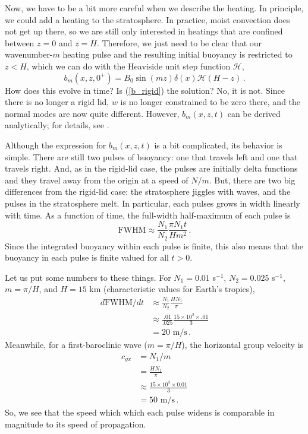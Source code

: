 \documentclass[12pt]{article}
\begin{document}
Now, we have to be a bit more careful when we describe the heating.  In principle, we could add a heating to the stratosphere.  In practice, moist convection does not get up there, so we are still only interested in heatings that are confined between $z=0$ and $z=H$.  Therefore, we just need to be clear that our wavenumber-$m$ heating pulse and the resulting initial buoyancy is restricted to $z<H$, which we can do with the Heaviside unit step function $\mathcal{H}$,
\begin{equation}
b_m(x,z,0^+) = B_0 \sin(mz) \delta(x) \mathcal{H}(H-z) \, . \label{b_initial_leaky}
\end{equation}
How does this evolve in time?  Is (\ref{b_rigid}) the solution?  No, it is not.  Since there is no longer a rigid lid, $w$ is no longer constrained to be zero there, and the normal modes are now quite different.  However, $b_m(x,z,t)$ can be derived analytically; for details, see \citet{15leaky}.


Although the expression for $b_m(x,z,t)$ is a bit complicated, its behavior is simple.  There are still two pulses of buoyancy: one that travels left and one that travels right.  And, as in the rigid-lid case, the pulses are initially delta functions and they travel away from the origin at a speed of $N/m$.  But, there are two big differences from the rigid-lid case: the stratosphere jiggles with waves, and the pulses in the stratosphere melt.  In particular, each pulses grows in width linearly with time.  As a function of time, the full-width half-maximum of each pulse is
\[
\text{FWHM} \approx \frac{N_1}{N_2} \frac{\pi N_1 t}{H m^2} \, .
\]
Since the integrated buoyancy within each pulse is finite, this also means that the buoyancy in each pulse is finite valued for all $t>0$.


Let us put some numbers to these things.  For $N_1 = 0.01$ s$^{-1}$, $N_2 = 0.025$ s$^{-1}$, $m = \pi/H$, and $H = 15$ km (characteristic values for Earth's tropics), 
\begin{align}
d\text{FWHM}/dt &\approx \frac{N_1}{N_2} \frac{H N_1}{\pi} \\
&\approx \frac{.01}{.025} \frac{15 \times 10^3 \times .01}{3} \\
&= 20 \text{ m/s} \, .
\end{align}
Meanwhile, for a first-baroclinic wave ($m = \pi/H$), the horizontal group velocity is
\begin{align}
c_{gx} &= N_1/m \\
&= \frac{H N_1}{\pi} \\
&\approx \frac{15 \times 10^3 \times 0.01}{3} \\
&= 50 \text{ m/s} \, .
\end{align}
So, we see that the speed which which each pulse widens is comparable in magnitude to its speed of propagation.
\end{document}
